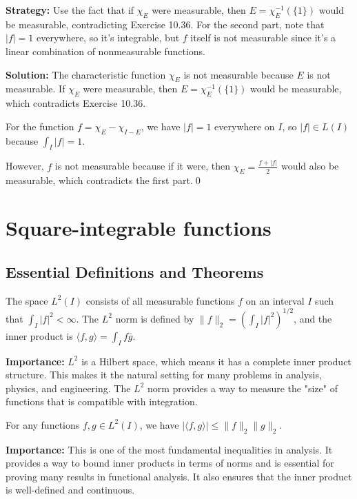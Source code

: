 \noindent\textbf{Strategy:} Use the fact that if $\chi_E$ were measurable, then $E = \chi_E^{-1}(\{1\})$ would be measurable, contradicting Exercise 10.36. For the second part, note that $|f| = 1$ everywhere, so it's integrable, but $f$ itself is not measurable since it's a linear combination of nonmeasurable functions.

\bigskip\noindent\textbf{Solution:}
The characteristic function $\chi_E$ is not measurable because $E$ is not measurable. If $\chi_E$ were measurable, then $E = \chi_E^{-1}(\{1\})$ would be measurable, which contradicts Exercise 10.36.

For the function $f = \chi_E - \chi_{I-E}$, we have $|f| = 1$ everywhere on $I$, so $|f| \in L(I)$ because $\int_I |f| = 1$.

However, $f$ is not measurable because if it were, then $\chi_E = \frac{f + |f|}{2}$ would also be measurable, which contradicts the first part.\qed
\section{Square-integrable functions}

\subsection*{Essential Definitions and Theorems}

\begin{definition}[$L^2$ Space]
The space $L^2(I)$ consists of all measurable functions $f$ on an interval $I$ such that $\int_I |f|^2 < \infty$. The $L^2$ norm is defined by $\|f\|_2 = \left(\int_I |f|^2\right)^{1/2}$, and the inner product is $\langle f, g \rangle = \int_I f \overline{g}$.
\end{definition}

\noindent\textbf{Importance:} $L^2$ is a Hilbert space, which means it has a complete inner product structure. This makes it the natural setting for many problems in analysis, physics, and engineering. The $L^2$ norm provides a way to measure the "size" of functions that is compatible with integration.



\begin{definition}
For any functions $f, g \in L^2(I)$, we have $|\langle f, g \rangle| \leq \|f\|_2 \|g\|_2$.
\end{definition}

\noindent\textbf{Importance:} This is one of the most fundamental inequalities in analysis. It provides a way to bound inner products in terms of norms and is essential for proving many results in functional analysis. It also ensures that the inner product is well-defined and continuous.



